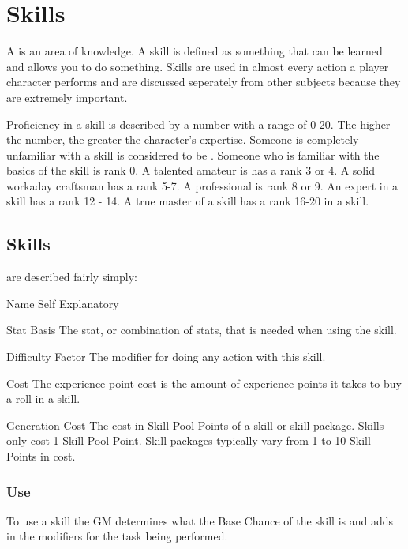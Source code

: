 \chapter{Skills}

A  is an area of knowledge. A skill is defined as something that can
be learned and allows you to do something. Skills are used in almost every
action a player character performs and are discussed seperately from
other subjects because they are extremely important.

Proficiency in a skill is described by a number with a range of 0-20.
The higher the number, the greater the character's expertise. Someone
is completely unfamiliar with a skill is considered to be
. Someone who is familiar with the basics of
the skill is rank 0. A talented amateur is has a rank 3 or 4. A
solid workaday craftsman has a rank 5-7. A professional is rank 8 or 9. 
An expert in a skill has a rank 12 - 14.
A true master of a skill has a rank 16-20 in a skill. 

\section{Skills}

 are described fairly simply:

\begin{relate}
	\item[Name] 
	Self Explanatory
	\item[Stat Basis] 
	The stat, or combination of stats, that is needed
	when using the skill.
	\item[Difficulty Factor] 
	The modifier for doing any action with this skill.
	\item[Cost] 
	The experience point cost is the amount of experience points it takes to
	buy a roll in a skill. 
	\item[Generation Cost]
	The cost in Skill Pool Points of a skill or skill package. Skills
	only cost 1 Skill Pool Point. Skill packages typically vary from 1
	to 10 Skill Points in cost.
\end{relate}

\subsection{Use}

To use a skill the GM determines what the Base Chance of the skill is 
and adds in the modifiers for the task being performed.

